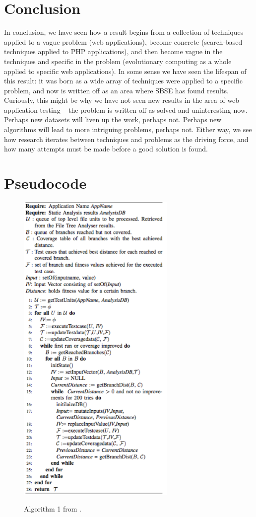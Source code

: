 \documentclass{sig-alternate-05-2015}
\begin{document}
\section{Conclusion}

In conclusion, we have seen how a result begins from a collection of techniques applied to a vague problem (web applications), become concrete (search-based techniques applied to PHP applications), and then become vague in the techniques and specific in the problem (evolutionary computing as a whole applied to specific web applications). In some sense we have seen the lifespan of this result: it was born as a wide array of techniques were applied to a specific problem, and now is written off as an area where SBSE has found results. Curiously, this might be why we have not seen new results in the area of web application testing -- the problem is written off as solved and uninteresting now. Perhaps new datasets will liven up the work, perhaps not. Perhaps new algorithms will lead to more intriguing problems, perhaps not. Either way, we see how research iterates between techniques and problems as the driving force, and how many attempts must be made before a good solution is found.

\newpage

 

\newpage
\appendix
\section{Pseudocode}

\begin{figure}[!h]
\centering
\includegraphics[width=3in]{images/algorithm1.png}
\label{fig:algorithm1}
\caption{Algorithm 1 from \cite{alshahwan2011automated}.}
\end{figure}
\end{document}
